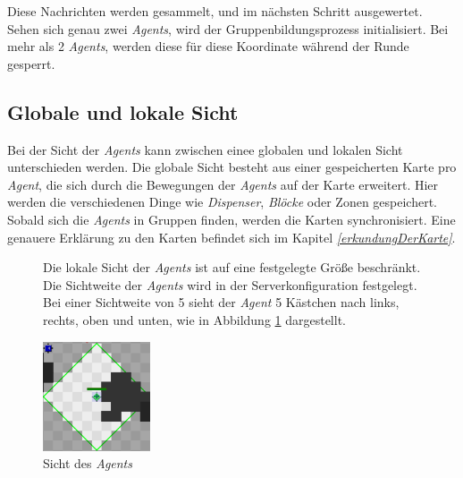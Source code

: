 Diese Nachrichten werden gesammelt, und im nächsten Schritt ausgewertet. Sehen sich genau zwei \textit{Agents}, wird der Gruppenbildungsprozess initialisiert. Bei mehr als 2 \textit{Agents}, werden diese für diese Koordinate während der Runde gesperrt. \\


\subsection{Globale und lokale Sicht} \label{kap:lokaleSicht}
Bei der Sicht der \textit{Agents} kann zwischen einee globalen und lokalen Sicht unterschieden werden. Die globale Sicht besteht aus einer gespeicherten Karte pro \textit{Agent}, die sich durch die Bewegungen der \textit{Agents} auf der Karte erweitert. Hier werden die verschiedenen Dinge wie \textit{Dispenser}, \textit{Blöcke} oder Zonen gespeichert. Sobald sich die \textit{Agents} in Gruppen finden, werden die Karten synchronisiert. Eine genauere Erklärung zu den Karten befindet sich im Kapitel \textit{\ref{erkundungDerKarte}}.

\begin{figure}
	\begin{minipage}{0.6\textwidth}
		Die lokale Sicht der \textit{Agents} ist auf eine festgelegte Größe beschränkt. Die Sichtweite der \textit{Agents} wird in der Serverkonfiguration festgelegt. Bei einer Sichtweite von 5 sieht der \textit{Agent} 5 Kästchen nach links, rechts, oben und unten, wie in Abbildung \ref{fig:agentensicht} dargestellt.
	\end{minipage}
	\begin{minipage}{0.4\textwidth}
		\centering
		\includegraphics[width=120px]{bilder/agentensicht}
		\caption{Sicht des \textit{Agents}}
		\label{fig:agentensicht}
	\end{minipage}
\end{figure}

